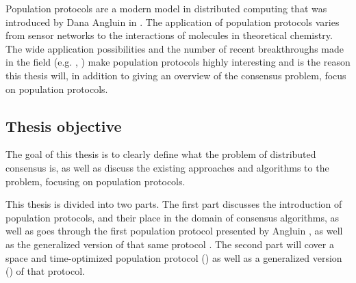 Population protocols are a modern model in distributed computing that was introduced by Dana Angluin in \cite{angluinComputationNetworksPassively2006}. The application of population protocols varies from sensor networks to the interactions of molecules in theoretical chemistry. \cite{aspnesIntroductionPopulationProtocols2009} The wide application possibilities and the number of recent breakthroughs made in the field (e.g. \cite{dotyTimeSpaceOptimal2022}, \cite{bankhamerPopulationProtocolsExact2022}) make population protocols highly interesting and is the reason this thesis will, in addition to giving an overview of the consensus problem, focus on population protocols.


\subsection{Thesis objective}
The goal of this thesis is to clearly define what the problem of distributed consensus is, as well as discuss the existing approaches and algorithms to the problem, focusing on population protocols.

This thesis is divided into two parts. The first part discusses the introduction of population protocols, and their place in the domain of consensus algorithms, as well as goes through the first population protocol presented by Angluin \cite{angluinSimplePopulationProtocol2008}, as well as the generalized version of that same protocol \cite{AspnesFastConverganceOfKOpinion2023}. The second part will cover a space and time-optimized population protocol (\cite{dotyTimeSpaceOptimal2022}) as well as a generalized version (\cite{bankhamerPopulationProtocolsExact2022}) of that protocol. 
